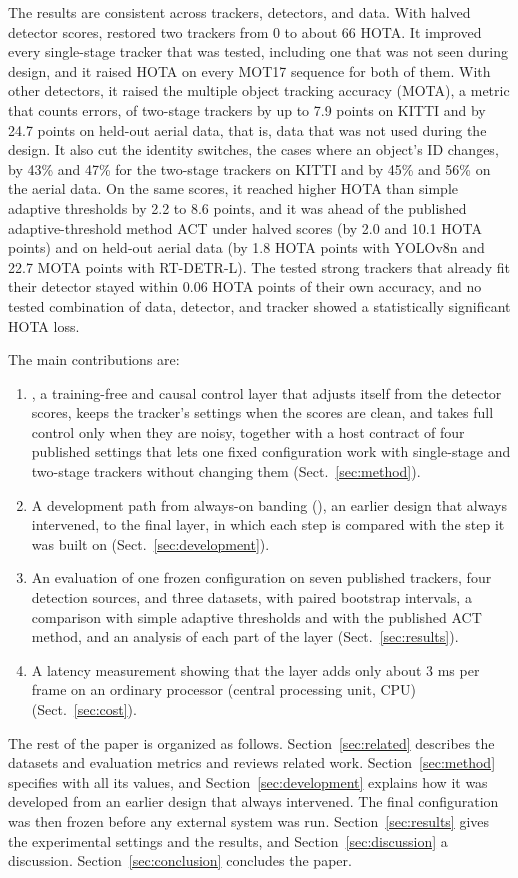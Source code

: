 The results are consistent across trackers, detectors, and data. With halved detector scores,
\scl{} restored two trackers from 0 to about 66 HOTA. It improved every single-stage tracker that
was tested, including one that was not seen during design, and it raised HOTA on every MOT17
sequence for both of them. With other detectors, it raised the multiple object tracking accuracy
(MOTA), a metric that counts errors, of two-stage trackers by up to 7.9 points on KITTI and by 24.7
points on held-out aerial data, that is, data that was not used during the design. It also cut the
identity switches, the cases where an object's ID changes, by 43\% and 47\% for the two-stage
trackers on KITTI and by 45\% and 56\% on the aerial data. On the same scores, it reached higher
HOTA than simple adaptive thresholds by 2.2 to 8.6 points, and it was ahead of the published
adaptive-threshold method ACT under halved scores (by 2.0 and 10.1 HOTA points) and on held-out
aerial data (by 1.8 HOTA points with YOLOv8n and 22.7 MOTA points with RT-DETR-L). The tested strong
trackers that already fit their detector stayed within 0.06 HOTA points of their own accuracy, and
no tested combination of data, detector, and tracker showed a statistically significant HOTA loss.

The main contributions are:
\begin{enumerate}
\item \scl{}, a training-free and causal control layer that adjusts itself from the detector scores,
      keeps the tracker's settings when the scores are clean, and takes full control only when they
      are noisy, together with a host contract of four published settings that lets one fixed
      configuration work with single-stage and two-stage trackers without changing them
      (Sect.~\ref{sec:method}).
\item A development path from always-on banding (\aob{}), an earlier design that always
      intervened, to the final layer, in which each step is compared with the step it was built on
      (Sect.~\ref{sec:development}).
\item An evaluation of one frozen configuration on seven published trackers, four detection
      sources, and three datasets, with paired bootstrap intervals, a comparison with simple
      adaptive thresholds and with the published ACT method, and an analysis of each part of the
      layer (Sect.~\ref{sec:results}).
\item A latency measurement showing that the layer adds only about 3 ms per frame on an ordinary
      processor (central processing unit, CPU) (Sect.~\ref{sec:cost}).
\end{enumerate}

The rest of the paper is organized as follows. Section~\ref{sec:related} describes the datasets and
evaluation metrics and reviews related work. Section~\ref{sec:method} specifies \scl{} with all its
values, and Section~\ref{sec:development} explains how it was developed from an earlier design that
always intervened. The final configuration was then frozen before any external system was run.
Section~\ref{sec:results} gives the experimental settings and the results, and
Section~\ref{sec:discussion} a discussion. Section~\ref{sec:conclusion} concludes the paper.
